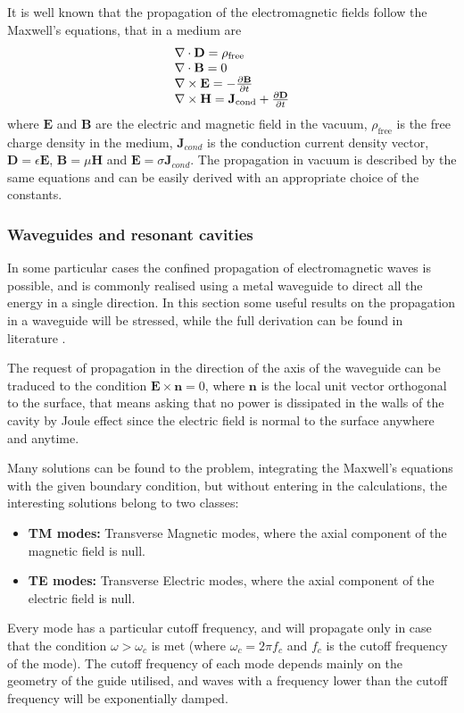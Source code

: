 It is well known that the propagation of the electromagnetic fields follow the Maxwell's equations, that in a medium are
\begin{equation}
\begin{array}{l l l l}
\nabla \cdot \mathbf{D} = \rho_\text{free}\\
\nabla \cdot \mathbf{B} = 0\\
\nabla \times \mathbf{E} = - \frac{\partial \mathbf{B}}{\partial t}\\
\nabla \times \mathbf{H} = \mathbf{J}_\text{cond} + \frac{\partial \mathbf{D}}{\partial t}
\end{array}
\end{equation}
where $\mathbf{E}$ and $\mathbf{B}$ are the electric and magnetic field in the vacuum, $\rho_\text{free}$ is the free charge density in the medium, $\mathbf{J}_{cond}$ is the conduction current density vector, $\mathbf{D} = \epsilon \mathbf{E}$, $\mathbf{B} = \mu \mathbf{H}$ and $\mathbf{E} = \sigma \mathbf{J}_{cond}$. The propagation in vacuum is described by the same equations and can be easily derived with an appropriate choice of the constants.

\subsubsection[Waveguides and resonant cavities]{Waveguides and resonant cavities}

In some particular cases the confined propagation of electromagnetic waves is possible, and is commonly realised using a metal waveguide to direct all the energy in a single direction. In this section some useful results on the propagation in a waveguide will be stressed, while the full derivation can be found in literature \cite{Weiss:261732,Botta:EM, Jackson:ClassEM}. 

The request of propagation in the direction of the axis of the waveguide can be traduced to the condition $\mathbf{E} \times \mathbf{n} = 0$, where $\mathbf{n}$ is the local unit vector orthogonal to the surface, that means asking that no power is dissipated in the walls of the cavity by Joule effect since the electric field is normal to the surface anywhere and anytime.

Many solutions can be found to the problem, integrating the Maxwell's equations with the given boundary condition, but without entering in the calculations, the interesting solutions belong to two classes:
\begin{itemize}
\item \textbf{TM modes:} Transverse Magnetic modes, where the axial component of the magnetic field is null.
\item \textbf{TE modes:} Transverse Electric modes, where the axial component of the electric field is null.
\end{itemize}
Every mode has a particular cutoff frequency, and will propagate only in case that the condition $\omega > \omega_c$ is met (where $\omega_c = 2\pi f_c$ and $f_c$ is the cutoff frequency of the mode). The cutoff frequency of each mode depends mainly on the geometry of the guide utilised, and waves with a frequency lower than the cutoff frequency will be exponentially damped.


